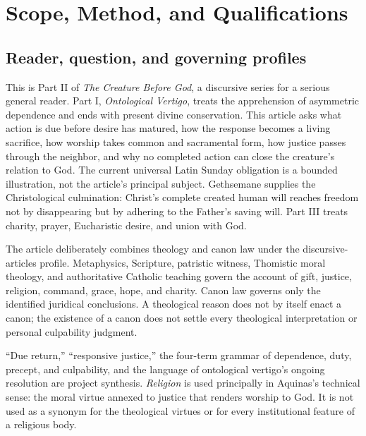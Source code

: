 \section{Scope, Method, and Qualifications}

\subsection{Reader, question, and governing profiles}

This is Part II of \emph{The Creature Before God}, a discursive series for a serious general reader. Part I, \emph{Ontological Vertigo}, treats the apprehension of asymmetric dependence and ends with present divine conservation. This article asks what action is due before desire has matured, how the response becomes a living sacrifice, how worship takes common and sacramental form, how justice passes through the neighbor, and why no completed action can close the creature's relation to God. The current universal Latin Sunday obligation is a bounded illustration, not the article's principal subject. Gethsemane supplies the Christological culmination: Christ's complete created human will reaches freedom not by disappearing but by adhering to the Father's saving will. Part III treats charity, prayer, Eucharistic desire, and union with God.

The article deliberately combines theology and canon law under the discursive-articles profile. Metaphysics, Scripture, patristic witness, Thomistic moral theology, and authoritative Catholic teaching govern the account of gift, justice, religion, command, grace, hope, and charity. Canon law governs only the identified juridical conclusions. A theological reason does not by itself enact a canon; the existence of a canon does not settle every theological interpretation or personal culpability judgment.

``Due return,'' ``responsive justice,'' the four-term grammar of dependence, duty, precept, and culpability, and the language of ontological vertigo's ongoing resolution are project synthesis. \emph{Religion} is used principally in Aquinas's technical sense: the moral virtue annexed to justice that renders worship to God. It is not used as a synonym for the theological virtues or for every institutional feature of a religious body.

